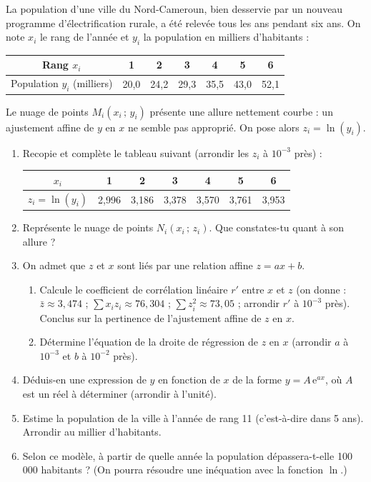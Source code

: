 \documentclass[11pt]{article}
\begin{document}
\begin{exercice}
La population d'une ville du Nord-Cameroun, bien desservie par un nouveau programme d'électrification rurale, a été relevée tous les ans pendant six ans. On note $x_i$ le rang de l'année et $y_i$ la population en milliers d'habitants :

\begin{center}
\begin{tabular}{|c|cccccc|}
\hline
\rowcolor{popblueL} Rang $x_i$ & 1 & 2 & 3 & 4 & 5 & 6 \\
\hline
Population $y_i$ (milliers) & 20{,}0 & 24{,}2 & 29{,}3 & 35{,}5 & 43{,}0 & 52{,}1 \\
\hline
\end{tabular}
\end{center}

Le nuage de points $M_i(x_i\,;\,y_i)$ présente une allure nettement courbe : un ajustement affine de $y$ en $x$ ne semble pas approprié. On pose alors $z_i=\ln(y_i)$.

\begin{enumerate}
\item Recopie et complète le tableau suivant (arrondir les $z_i$ à $10^{-3}$ près) :

\begin{center}
\begin{tabular}{|c|cccccc|}
\hline
\rowcolor{popblueL} $x_i$ & 1 & 2 & 3 & 4 & 5 & 6 \\
\hline
$z_i=\ln(y_i)$ & 2,996 & 3,186 & 3,378 & 3,570 & 3,761 & 3,953 \\
\hline
\end{tabular}
\end{center}

\item Représente le nuage de points $N_i(x_i\,;\,z_i)$. Que constates-tu quant à son allure ?
\item On admet que $z$ et $x$ sont liés par une relation affine $z=ax+b$.
\begin{enumerate}
\item Calcule le coefficient de corrélation linéaire $r'$ entre $x$ et $z$ (on donne : $\bar{z}\approx 3{,}474$ ; $\displaystyle\sum x_iz_i\approx 76{,}304$ ; $\displaystyle\sum z_i^2\approx 73{,}05$ ; arrondir $r'$ à $10^{-3}$ près). Conclus sur la pertinence de l'ajustement affine de $z$ en $x$.
\item Détermine l'équation de la droite de régression de $z$ en $x$ (arrondir $a$ à $10^{-3}$ et $b$ à $10^{-2}$ près).
\end{enumerate}
\item Déduis-en une expression de $y$ en fonction de $x$ de la forme $y=A\,\mathrm{e}^{ax}$, où $A$ est un réel à déterminer (arrondir à l'unité).
\item Estime la population de la ville à l'année de rang 11 (c'est-à-dire dans 5 ans). Arrondir au millier d'habitants.
\item Selon ce modèle, à partir de quelle année la population dépassera-t-elle 100 000 habitants ? (On pourra résoudre une inéquation avec la fonction $\ln$.)
\end{enumerate}
\end{exercice}
\end{document}
